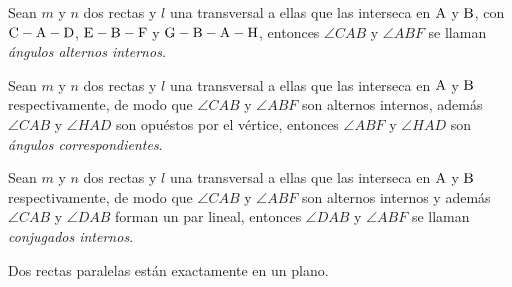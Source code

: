\clearpage

\begin{definition}
    Sean $m$ y $n$ dos rectas y $l$ una transversal a ellas que las interseca en $\rm A$ y $\rm B$, con $\rm C-A-D$, $\rm E-B-F$ y $\rm G-B-A-H$, entonces $\angle{CAB}$ y $\angle{ABF}$ se llaman \textit{ángulos alternos internos}.

    \begin{figure}[!h]
        \centering
        
        \label{fig:alternos-internos}
    \end{figure}
    
\end{definition}

\begin{definition}
    Sean $m$ y $n$ dos rectas y $l$ una transversal a ellas que las interseca en $\rm A$ y $\rm B$ respectivamente, de modo que $\angle{CAB}$ y $\angle{ABF}$ son alternos internos, además $\angle{CAB}$ y $\angle{HAD}$ son opuéstos por el vértice, entonces $\angle{ABF}$ y $\angle{HAD}$ son \textit{ángulos correspondientes}.

    \begin{figure}[!h]
        \centering
        
        \label{fig:correspondientes}
    \end{figure}
    
\end{definition}

\clearpage

\begin{definition}
    Sean $m$ y $n$ dos rectas y $l$ una transversal a ellas que las interseca en $\rm A$ y $\rm B$ respectivamente, de modo que $\angle{CAB}$ y $\angle{ABF}$ son alternos internos y además $\angle{CAB}$ y $\angle{DAB}$ forman un par lineal, entonces $\angle{DAB}$ y $\angle{ABF}$ se llaman \textit{conjugados internos}.

    \begin{figure}[!h]
        \centering
        
        \label{fig:conjugados}
    \end{figure}
    
\end{definition}

\begin{theorem}
    Dos rectas paralelas están exactamente en un plano.
\end{theorem}

